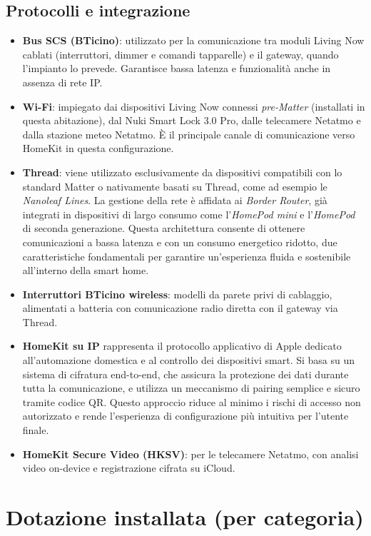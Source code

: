 \subsection{Protocolli e integrazione}
\begin{itemize}
  \item \textbf{Bus SCS (BTicino)}: utilizzato per la comunicazione tra moduli Living Now cablati (interruttori, dimmer e comandi tapparelle) e il gateway, quando l’impianto lo prevede. Garantisce bassa latenza e funzionalità anche in assenza di rete IP.
  \item \textbf{Wi-Fi}: impiegato dai dispositivi Living Now connessi \textit{pre-Matter} (installati in questa abitazione), dal Nuki Smart Lock 3.0 Pro, dalle telecamere Netatmo e dalla stazione meteo Netatmo. È il principale canale di comunicazione verso HomeKit in questa configurazione.
  \item \textbf{Thread}: viene utilizzato esclusivamente da dispositivi compatibili con lo standard Matter o nativamente basati su Thread, come ad esempio le \emph{Nanoleaf Lines}. La gestione della rete è affidata ai \textit{Border Router}, già integrati in dispositivi di largo consumo come l’\emph{HomePod mini} e l’\emph{HomePod} di seconda generazione. Questa architettura consente di ottenere comunicazioni a bassa latenza e con un consumo energetico ridotto, due caratteristiche fondamentali per garantire un’esperienza fluida e sostenibile all’interno della smart home.
  \item \textbf{Interruttori BTicino wireless}: modelli da parete privi di cablaggio, alimentati a batteria con comunicazione radio diretta con il gateway via Thread.
  \item \textbf{HomeKit su IP} rappresenta il protocollo applicativo di Apple dedicato all’automazione domestica e al controllo dei dispositivi smart. Si basa su un sistema di cifratura end-to-end, che assicura la protezione dei dati durante tutta la comunicazione, e utilizza un meccanismo di pairing semplice e sicuro tramite codice QR. Questo approccio riduce al minimo i rischi di accesso non autorizzato e rende l’esperienza di configurazione più intuitiva per l’utente finale.
  \item \textbf{HomeKit Secure Video (HKSV)}: per le telecamere Netatmo, con analisi video on-device e registrazione cifrata su iCloud.
\end{itemize}

\section{Dotazione installata (per categoria)}
